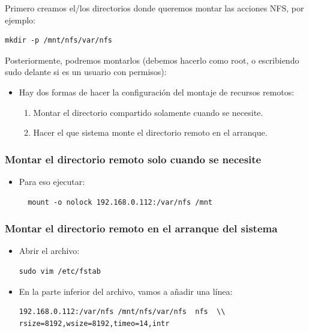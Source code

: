 \documentclass[a4paper,11pt]{article}
\begin{document}
Primero creamos el/los directorios donde queremos montar las acciones NFS, por
ejemplo:

\begin{verbatim}
mkdir -p /mnt/nfs/var/nfs
\end{verbatim}

Posteriormente, podremos montarlos (debemos hacerlo como root, o
escribiendo sudo delante si es un usuario con permisos):

\begin{itemize}
  \item Hay dos formas de hacer la configuración del montaje de recursos
        remotos:
        \begin{enumerate}
          \item Montar el directorio compartido solamente cuando se
                necesite.
          \item Hacer el que sistema monte el directorio remoto en el
                arranque.
        \end{enumerate}
\end{itemize}

\subsubsection{Montar el directorio remoto solo cuando se necesite}
\begin{itemize}
  \item Para eso ejecutar:
\begin{verbatim}
  mount -o nolock 192.168.0.112:/var/nfs /mnt
\end{verbatim}
\end{itemize}

\subsubsection{Montar el directorio remoto en el arranque del sistema}
\begin{itemize}
  \item Abrir el archivo:
\begin{verbatim}
sudo vim /etc/fstab
\end{verbatim}
\item En la parte inferior del archivo, vamos a añadir una línea:
\begin{verbatim}
192.168.0.112:/var/nfs /mnt/nfs/var/nfs  nfs  \\
rsize=8192,wsize=8192,timeo=14,intr
\end{verbatim}
\end{itemize}
\end{document}
